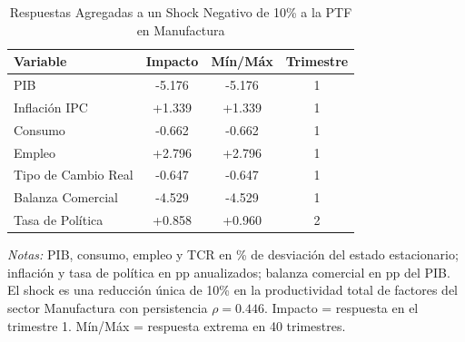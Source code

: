 \begin{table}[htbp]
\centering
\caption{Respuestas Agregadas a un Shock Negativo de 10\% a la PTF en Manufactura}
\label{tab:mfg_agg}
\begin{threeparttable}
\begin{tabular}{@{}l c c c@{}}
\toprule
Variable & Impacto & Mín/Máx & Trimestre \\
\midrule
PIB & -5.176 & -5.176 & 1 \\
Inflación IPC & +1.339 & +1.339 & 1 \\
Consumo & -0.662 & -0.662 & 1 \\
Empleo & +2.796 & +2.796 & 1 \\
Tipo de Cambio Real & -0.647 & -0.647 & 1 \\
Balanza Comercial & -4.529 & -4.529 & 1 \\
Tasa de Política & +0.858 & +0.960 & 2 \\
\bottomrule
\end{tabular}
\begin{tablenotes}[flushleft]
\footnotesize
\item \textit{Notas:} PIB, consumo, empleo y TCR en \% de desviación del estado estacionario; inflación y tasa de política en pp anualizados; balanza comercial en pp del PIB. El shock es una reducción única de 10\% en la productividad total de factores del sector Manufactura con persistencia $\rho = 0.446$. Impacto = respuesta en el trimestre 1. Mín/Máx = respuesta extrema en 40 trimestres.
\end{tablenotes}
\end{threeparttable}
\end{table}
